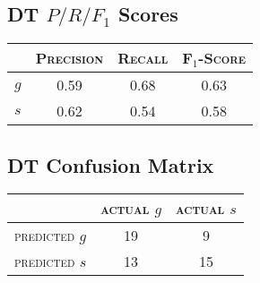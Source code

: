 \begin{multicols}{2}
\subsection{DT $P/R/F_1$ Scores}
\begin{tabular}{ c | c  c  c }
	& \textsc{Precision} & \textsc{Recall} & \textsc{F$_1$-Score} \\
	\hline
	\textsc{$g$} 	& 0.59 & 0.68 & 0.63 \\
	\textsc{$s$}	& 0.62 & 0.54 & 0.58
\end{tabular}
\subsection{DT Confusion Matrix}
\begin{tabular}{ c | c  c }
	 & \textsc{actual $g$} & \textsc{actual $s$} \\
	\hline
	\textsc{predicted $g$} 	& 19 & 9 \\
	\textsc{predicted $s$}		& 13 & 15
\end{tabular}
\end{multicols}

\newpage

